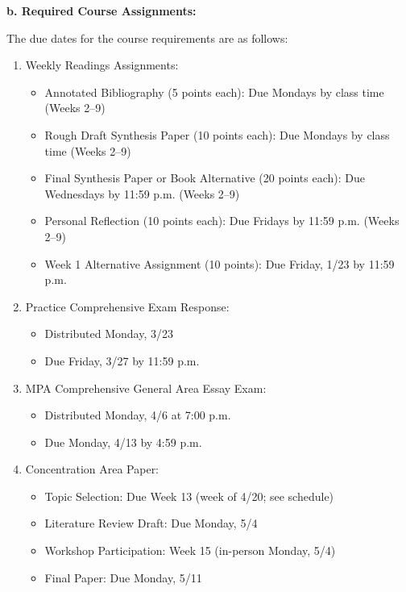 \documentclass[11pt]{article}     %
\begin{document}
\vspace{1em}
\noindent \textbf{b. Required Course Assignments:}

The due dates for the course requirements are as follows:
\begin{enumerate}
    \item Weekly Readings Assignments:
        \begin{itemize}
            \item Annotated Bibliography (5 points each): Due Mondays by class time (Weeks 2--9)
            \item Rough Draft Synthesis Paper (10 points each): Due Mondays by class time (Weeks 2--9)
            \item Final Synthesis Paper or Book Alternative (20 points each): Due Wednesdays by 11:59 p.m. (Weeks 2--9)
            \item Personal Reflection (10 points each): Due Fridays by 11:59 p.m. (Weeks 2--9)
            \item Week 1 Alternative Assignment (10 points): Due Friday, 1/23 by 11:59 p.m.
        \end{itemize}
    \item Practice Comprehensive Exam Response:
        \begin{itemize}
            \item Distributed Monday, 3/23
            \item Due Friday, 3/27 by 11:59 p.m.
        \end{itemize}
    \item MPA Comprehensive General Area Essay Exam:
        \begin{itemize}
            \item Distributed Monday, 4/6 at 7:00 p.m.
            \item Due Monday, 4/13 by 4:59 p.m.
        \end{itemize}
    \item Concentration Area Paper:
        \begin{itemize}
            \item Topic Selection: Due Week 13 (week of 4/20; see schedule)
            \item Literature Review Draft: Due Monday, 5/4
            \item Workshop Participation: Week 15 (in-person Monday, 5/4)
            \item Final Paper: Due Monday, 5/11
        \end{itemize}
\end{enumerate}
\end{document}
